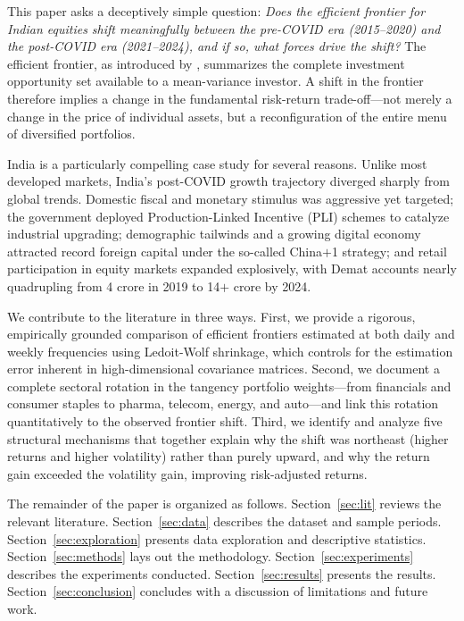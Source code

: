\documentclass[12pt,a4paper]{article}
\begin{document}
This paper asks a deceptively simple question: \textit{Does the efficient frontier for
Indian equities shift meaningfully between the pre-COVID era (2015--2020) and the
post-COVID era (2021--2024), and if so, what forces drive the shift?} The efficient
frontier, as introduced by \citet{Markowitz1952}, summarizes the complete investment
opportunity set available to a mean-variance investor. A shift in the frontier therefore
implies a change in the fundamental risk-return trade-off---not merely a change in the
price of individual assets, but a reconfiguration of the entire menu of diversified
portfolios.

India is a particularly compelling case study for several reasons. Unlike most developed
markets, India's post-COVID growth trajectory diverged sharply from global trends.
Domestic fiscal and monetary stimulus was aggressive yet targeted; the government
deployed Production-Linked Incentive (PLI) schemes to catalyze industrial upgrading;
demographic tailwinds and a growing digital economy attracted record foreign capital under
the so-called China$+$1 strategy; and retail participation in equity markets expanded
explosively, with Demat accounts nearly quadrupling from 4 crore in 2019 to 14$+$ crore
by 2024.

We contribute to the literature in three ways. First, we provide a rigorous, empirically
grounded comparison of efficient frontiers estimated at both daily and weekly frequencies
using Ledoit-Wolf shrinkage, which controls for the estimation error inherent in
high-dimensional covariance matrices. Second, we document a complete sectoral rotation in
the tangency portfolio weights---from financials and consumer staples to pharma, telecom,
energy, and auto---and link this rotation quantitatively to the observed frontier shift.
Third, we identify and analyze five structural mechanisms that together explain why the
shift was northeast (higher returns and higher volatility) rather than purely upward,
and why the return gain exceeded the volatility gain, improving risk-adjusted returns.

The remainder of the paper is organized as follows. Section~\ref{sec:lit} reviews the
relevant literature. Section~\ref{sec:data} describes the dataset and sample periods.
Section~\ref{sec:exploration} presents data exploration and descriptive statistics.
Section~\ref{sec:methods} lays out the methodology. Section~\ref{sec:experiments}
describes the experiments conducted. Section~\ref{sec:results} presents the results.
Section~\ref{sec:conclusion} concludes with a discussion of limitations and future work.
\end{document}
